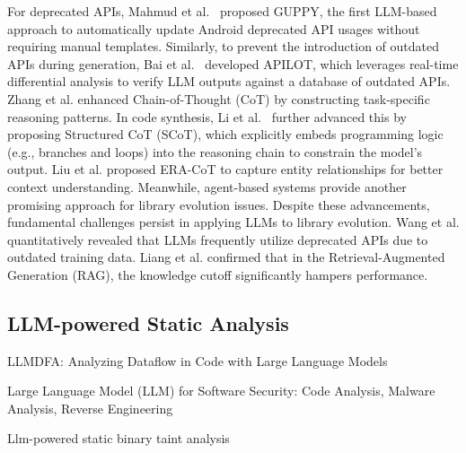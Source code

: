 For deprecated APIs, Mahmud et al.~\cite{mahmud2024automated} proposed GUPPY, the first LLM-based approach to automatically update Android deprecated API usages without requiring manual templates. Similarly, to prevent the introduction of outdated APIs during generation, Bai et al.~\cite{bai2024apilot} developed APILOT, which leverages real-time differential analysis to verify LLM outputs against a database of outdated APIs. 
Zhang et al.\cite{zhang2025enhancing} enhanced Chain-of-Thought (CoT) by constructing task-specific reasoning patterns. In code synthesis, Li et al.~\cite{li2025structured} further advanced this by proposing Structured CoT (SCoT), which explicitly embeds programming logic (e.g., branches and loops) into the reasoning chain to constrain the model's output. Liu et al.\cite{liu2024era} proposed ERA-CoT to capture entity relationships for better context understanding. 
Meanwhile, agent-based systems provide another promising approach for library evolution issues. 
Despite these advancements, fundamental challenges persist in applying LLMs to library evolution. Wang et al.\cite{wang2024llms} quantitatively revealed that LLMs frequently utilize deprecated APIs due to outdated training data. Liang et al.\cite{liang2025rustevo} confirmed that in the Retrieval-Augmented Generation (RAG), the knowledge cutoff significantly hampers performance. 





\subsection{LLM-powered Static Analysis}



LLMDFA: Analyzing Dataflow in Code with Large Language Models

Large Language Model (LLM) for Software Security: Code Analysis, Malware Analysis, Reverse Engineering

Llm-powered static binary taint analysis

